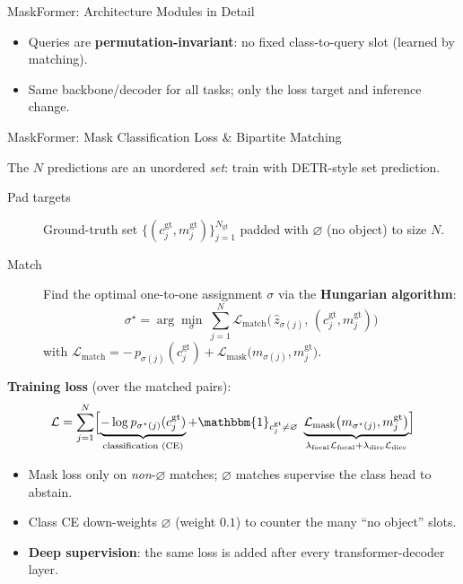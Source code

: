 \begin{frame}[fragile]{MaskFormer: Architecture Modules in Detail}
  \vspace{0.2em}
  \begin{itemize}\small
    \item Queries are \textbf{permutation-invariant}: no fixed class-to-query slot (learned by matching).
    \item Same backbone/decoder for all tasks; only the loss target and inference change.
  \end{itemize}
\end{frame}

\begin{frame}{MaskFormer: Mask Classification Loss \& Bipartite Matching}

  The $N$ predictions are an unordered \emph{set}: train with DETR-style set prediction.

  \vspace{0.3em}
  \begin{description}
    \item[Pad targets] Ground-truth set $\{(c_j^{\text{gt}}, m_j^{\text{gt}})\}_{j=1}^{N_\text{gt}}$ padded with $\varnothing$ (no object) to size $N$.
    \item[Match] Find the optimal one-to-one assignment $\sigma$ via the \textbf{Hungarian algorithm}:
      \[ \sigma^\star = \arg\min_{\sigma}\ \sum_{j=1}^{N} \mathcal{L}_\text{match}\bigl(\,\hat z_{\sigma(j)},\, (c_j^{\text{gt}}, m_j^{\text{gt}})\bigr) \]
      with $\mathcal{L}_\text{match} = -\,p_{\sigma(j)}(c_j^{\text{gt}}) + \mathcal{L}_\text{mask}\bigl(m_{\sigma(j)}, m_j^{\text{gt}}\bigr)$.
  \end{description}

  \vspace{0.2em}
  \textbf{Training loss} (over the matched pairs):
  \[
    \mathcal{L} = \sum_{j=1}^{N} \Bigl[ \underbrace{-\log p_{\sigma^\star(j)}(c_j^{\text{gt}})}_{\text{classification (CE)}}
      + \mathbbm{1}_{c_j^{\text{gt}} \neq \varnothing}\;\underbrace{\mathcal{L}_\text{mask}\bigl(m_{\sigma^\star(j)}, m_j^{\text{gt}}\bigr)}_{\lambda_\text{focal}\mathcal{L}_\text{focal} + \lambda_\text{dice}\mathcal{L}_\text{dice}} \Bigr]
  \]

  \vspace{0.2em}
  \begin{itemize}
    \item Mask loss only on \emph{non}-$\varnothing$ matches; $\varnothing$ matches supervise the class head to abstain.
    \item Class CE down-weights $\varnothing$ (weight $0.1$) to counter the many ``no object'' slots.
    \item \textbf{Deep supervision}: the same loss is added after every transformer-decoder layer.
  \end{itemize}
\end{frame}

